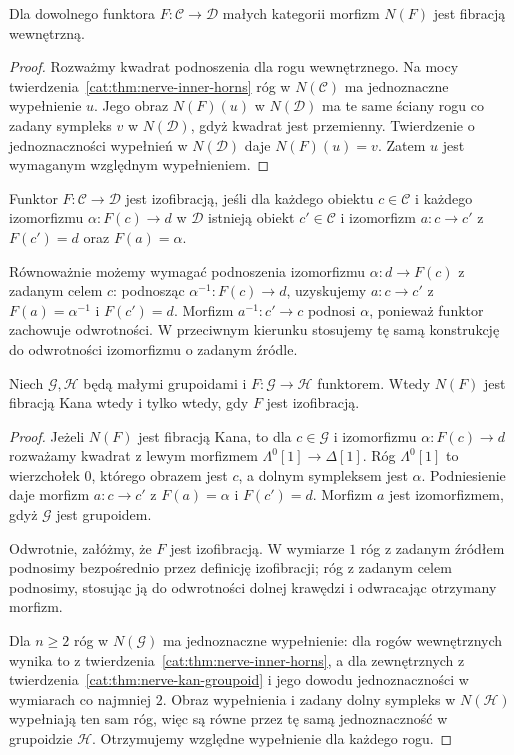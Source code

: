 \begin{stwierdzenie}\label{cat:prop:nerve-inner-fibration}
Dla dowolnego funktora $F:\mathcal C\to\mathcal D$ małych kategorii morfizm $N(F)$ jest fibracją wewnętrzną.
\end{stwierdzenie}
\begin{proof}
Rozważmy kwadrat podnoszenia dla rogu wewnętrznego. Na mocy twierdzenia~\ref{cat:thm:nerve-inner-horns} róg w $N(\mathcal C)$ ma jednoznaczne wypełnienie $u$. Jego obraz $N(F)(u)$ w $N(\mathcal D)$ ma te same ściany rogu co zadany sympleks $v$ w $N(\mathcal D)$, gdyż kwadrat jest przemienny. Twierdzenie o jednoznaczności wypełnień w $N(\mathcal D)$ daje $N(F)(u)=v$. Zatem $u$ jest wymaganym względnym wypełnieniem.
\end{proof}

\begin{definicja}\label{cat:def:ordinary-isofibration}
Funktor $F:\mathcal C\to\mathcal D$ jest izofibracją, jeśli dla każdego obiektu $c\in\mathcal C$ i każdego izomorfizmu $\alpha:F(c)\to d$ w $\mathcal D$ istnieją obiekt $c'\in\mathcal C$ i izomorfizm $a:c\to c'$ z $F(c')=d$ oraz $F(a)=\alpha$.
\end{definicja}
Równoważnie możemy wymagać podnoszenia izomorfizmu $\alpha:d\to F(c)$ z zadanym celem $c$: podnosząc $\alpha^{-1}:F(c)\to d$, uzyskujemy $a:c\to c'$ z $F(a)=\alpha^{-1}$ i $F(c')=d$. Morfizm $a^{-1}:c'\to c$ podnosi $\alpha$, ponieważ funktor zachowuje odwrotności. W przeciwnym kierunku stosujemy tę samą konstrukcję do odwrotności izomorfizmu o zadanym źródle.

\begin{twierdzenie}\label{cat:thm:nerve-groupoid-isofibration}
Niech $\mathcal G,\mathcal H$ będą małymi grupoidami i $F:\mathcal G\to\mathcal H$ funktorem. Wtedy $N(F)$ jest fibracją Kana wtedy i tylko wtedy, gdy $F$ jest izofibracją.
\end{twierdzenie}
\begin{proof}
Jeżeli $N(F)$ jest fibracją Kana, to dla $c\in\mathcal G$ i izomorfizmu $\alpha:F(c)\to d$ rozważamy kwadrat z lewym morfizmem $\Lambda^0[1]\to\Delta[1]$. Róg $\Lambda^0[1]$ to wierzchołek $0$, którego obrazem jest $c$, a dolnym sympleksem jest $\alpha$. Podniesienie daje morfizm $a:c\to c'$ z $F(a)=\alpha$ i $F(c')=d$. Morfizm $a$ jest izomorfizmem, gdyż $\mathcal G$ jest grupoidem.

Odwrotnie, załóżmy, że $F$ jest izofibracją. W wymiarze $1$ róg z zadanym źródłem podnosimy bezpośrednio przez definicję izofibracji; róg z zadanym celem podnosimy, stosując ją do odwrotności dolnej krawędzi i odwracając otrzymany morfizm.

Dla $n\geq2$ róg w $N(\mathcal G)$ ma jednoznaczne wypełnienie: dla rogów wewnętrznych wynika to z twierdzenia~\ref{cat:thm:nerve-inner-horns}, a dla zewnętrznych z twierdzenia~\ref{cat:thm:nerve-kan-groupoid} i jego dowodu jednoznaczności w wymiarach co najmniej $2$. Obraz wypełnienia i zadany dolny sympleks w $N(\mathcal H)$ wypełniają ten sam róg, więc są równe przez tę samą jednoznaczność w grupoidzie $\mathcal H$. Otrzymujemy względne wypełnienie dla każdego rogu.
\end{proof}

